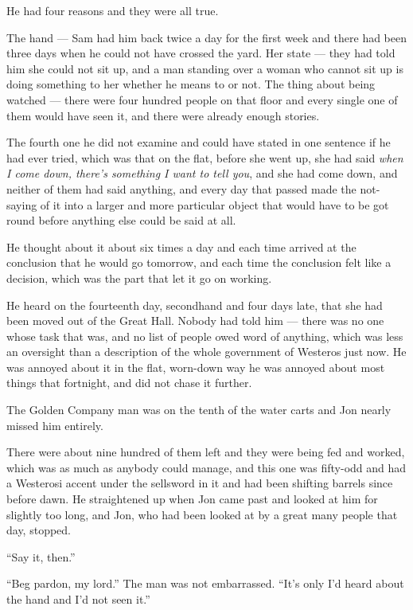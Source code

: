 He had four reasons and they were all true.

The hand — Sam had him back twice a day for the first week and there had been three days when he could not have crossed the yard. Her state — they had told him she could not sit up, and a man standing over a woman who cannot sit up is doing something to her whether he means to or not. The thing about being watched — there were four hundred people on that floor and every single one of them would have seen it, and there were already enough stories.

The fourth one he did not examine and could have stated in one sentence if he had ever tried, which was that on the flat, before she went up, she had said \textit{when I come down, there’s something I want to tell you}, and she had come down, and neither of them had said anything, and every day that passed made the not-saying of it into a larger and more particular object that would have to be got round before anything else could be said at all.

He thought about it about six times a day and each time arrived at the conclusion that he would go tomorrow, and each time the conclusion felt like a decision, which was the part that let it go on working.

He heard on the fourteenth day, secondhand and four days late, that she had been moved out of the Great Hall. Nobody had told him — there was no one whose task that was, and no list of people owed word of anything, which was less an oversight than a description of the whole government of Westeros just now. He was annoyed about it in the flat, worn-down way he was annoyed about most things that fortnight, and did not chase it further.

\sceneBreak

The Golden Company man was on the tenth of the water carts and Jon nearly missed him entirely.

There were about nine hundred of them left and they were being fed and worked, which was as much as anybody could manage, and this one was fifty-odd and had a Westerosi accent under the sellsword in it and had been shifting barrels since before dawn. He straightened up when Jon came past and looked at him for slightly too long, and Jon, who had been looked at by a great many people that day, stopped.

“Say it, then.”

“Beg pardon, my lord.” The man was not embarrassed. “It’s only I’d heard about the hand and I’d not seen it.”

